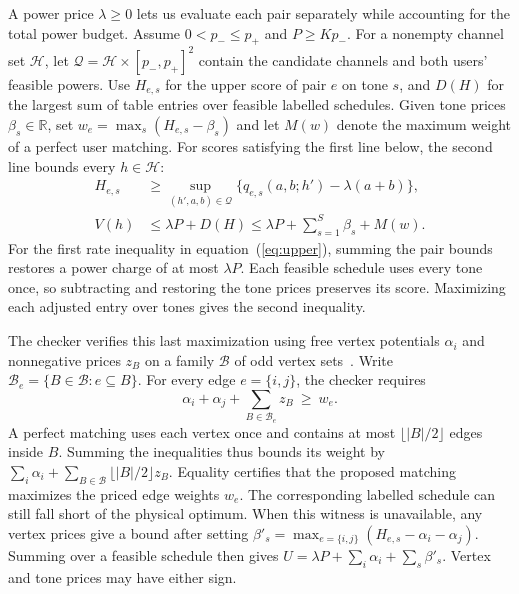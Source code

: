 \documentclass[lineno,pdflatex,sn-nature]{sn-jnl}
\begin{document}
A power price \(\lambda\geq0\) lets us evaluate each pair separately while accounting for the total power budget. Assume \(0<p_-\leq p_+\) and \(P\geq Kp_-\). For a nonempty channel set \(\mathcal H\), let \(\mathcal Q=\mathcal H\times[p_-,p_+]^2\) contain the candidate channels and both users' feasible powers. Use \(H_{e,s}\) for the upper score of pair \(e\) on tone \(s\), and \(D(H)\) for the largest sum of table entries over feasible labelled schedules. Given tone prices \(\beta_s\in\mathbb R\), set \(w_e=\max_s(H_{e,s}-\beta_s)\) and let \(M(w)\) denote the maximum weight of a perfect user matching. For scores satisfying the first line below, the second line bounds every \(h\in\mathcal H\):
\begin{equation}
\begin{aligned}
 H_{e,s} &\geq \sup_{(h',a,b)\in\mathcal Q}
       \bigl\{q_{e,s}(a,b;h')-\lambda(a+b)\bigr\},\\[2pt]
 V(h)&\leq\lambda P+D(H)\leq\lambda P+\sum_{s=1}^{S}\beta_s+M(w).
\end{aligned}
\label{eq:upper}
\end{equation}
For the first rate inequality in equation~(\ref{eq:upper}), summing the pair bounds restores a power charge of at most \(\lambda P\). Each feasible schedule uses every tone once, so subtracting and restoring the tone prices preserves its score. Maximizing each adjusted entry over tones gives the second inequality.

The checker verifies this last maximization using free vertex potentials \(\alpha_i\) and nonnegative prices \(z_B\) on a family \(\mathcal B\) of odd vertex sets~\cite{edmonds}. Write \(\mathcal B_e=\{B\in\mathcal B:e\subseteq B\}\). For every edge \(e=\{i,j\}\), the checker requires
\[
 \alpha_i+\alpha_j+\sum_{B\in\mathcal B_e}z_B\ \geq\ w_e .
\]
A perfect matching uses each vertex once and contains at most \(\lfloor |B|/2\rfloor\) edges inside \(B\). Summing the inequalities thus bounds its weight by \(\sum_i\alpha_i+\sum_{B\in\mathcal B}\lfloor |B|/2\rfloor z_B\). Equality certifies that the proposed matching maximizes the priced edge weights \(w_e\). The corresponding labelled schedule can still fall short of the physical optimum. When this witness is unavailable, any vertex prices give a bound after setting \(\beta'_s=\max_{e=\{i,j\}}(H_{e,s}-\alpha_i-\alpha_j)\). Summing over a feasible schedule then gives \(U=\lambda P+\sum_i\alpha_i+\sum_s\beta'_s\). Vertex and tone prices may have either sign.
\end{document}
